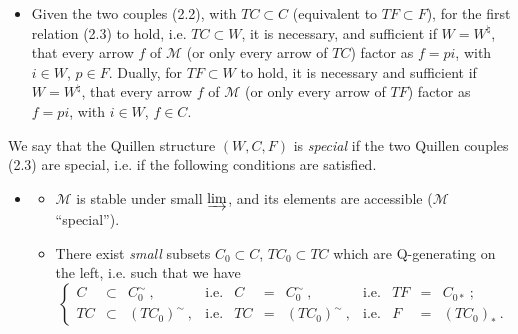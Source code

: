 \documentclass[11pt]{article}
\newcommand{\printedpage}[1]{\marginpar{\footnotesize p.~#1}}
\newcommand{\msp}[1]{\marginpar{\footnotesize [#1]}}
\newcommand{\M}{\mathcal{M}}
\begin{document}
\printedpage{9}

\msp{page 14}

\begin{itemize}[leftmargin=4em]
\item[(2.5)] Given the two couples (2.2), with $TC \subset C$ (equivalent to $TF \subset F$), for the first relation (2.3) to hold, i.e. $TC \subset W$, it is necessary, and sufficient if $W = W^{\natural}$, that every arrow $f$ of $\M$ (or only every arrow of $TC$) factor as $f = pi$, with $i \in W$, $p \in F$. Dually, for $TF \subset W$ to hold, it is necessary and sufficient if $W = W^{\natural}$, that every arrow $f$ of $\M$ (or only every arrow of $TF$) factor as $f = pi$, with $i \in W$, $f \in C$. %
\end{itemize}

We say that the Quillen structure $(W,C,F)$ is \textit{special} if the two Quillen couples (2.3) are special, i.e. if the following conditions are satisfied.

\begin{itemize}[leftmargin=4em]
\item[(2.6)]
\begin{itemize}
\item[a)] $\M$ is stable under small $\varinjlim$, and its elements are accessible ($\M$ ``special'').
\item[b)] There exist \textit{small} subsets $C_0 \subset C$, $TC_0 \subset TC$ which are Q-generating on the left, i.e. such that we have
\[
\left\{
\begin{array}{rclcrclcrcl}
C & \subset & C_0^{\sim}\ , & \text{i.e.} & C & = & C_0^{\sim}\ , & \text{i.e.} & TF & = & C_{0*}\ ;\\
TC & \subset & (TC_0)^{\sim}\ , & \text{i.e.} & TC & = & (TC_0)^{\sim}\ , & \text{i.e.} & F & = & (TC_0)_*\ .
\end{array}\right. %
\]
\end{itemize}
\end{itemize}
\end{document}
